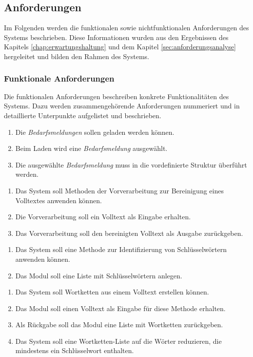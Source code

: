 \subsection{Anforderungen}
Im Folgenden werden die funktionalen sowie nichtfunktionalen Anforderungen des Systems beschrieben. Diese Informationen wurden aus den Ergebnissen des Kapitels \ref{chap:erwartungshaltung} und dem Kapitel \ref{sec:anforderungsanalyse} hergeleitet und bilden den Rahmen des Systems.
\subsubsection{Funktionale Anforderungen}
Die funktionalen Anforderungen beschreiben konkrete Funktionalitäten des Systems. Dazu werden zusammengehörende Anforderungen nummeriert und in detaillierte Unterpunkte aufgelistet und beschrieben.
\begin{enumerate}[label=1.\arabic*]
	\item Die \emph{Bedarfsmeldungen} sollen geladen werden können.
	\item Beim Laden wird eine \emph{Bedarfsmeldung} ausgewählt.
	\item Die ausgewählte \emph{Bedarfsmeldung} muss in die vordefinierte Struktur überführt werden.
\end{enumerate}
\begin{enumerate}[label=2.\arabic*]
	\item Das System soll Methoden der Vorverarbeitung zur Bereinigung eines Volltextes anwenden können.
	\item Die Vorverarbeitung soll ein Volltext als Eingabe erhalten.
	\item Das Vorverarbeitung soll den bereinigten Volltext als Ausgabe zurückgeben.
\end{enumerate}
\begin{enumerate}[label=3.\arabic*]
	\item Das System soll eine Methode zur Identifizierung von Schlüsselwörtern anwenden können.
	\item Das Modul soll eine Liste mit Schlüsselwörtern anlegen.
\end{enumerate}
\begin{enumerate}[label=4.\arabic*]
	\item Das System soll Wortketten aus einem Volltext erstellen können.
	\item Das Modul soll einen Volltext als Eingabe für diese Methode erhalten.
	\item Als Rückgabe soll das Modul eine Liste mit Wortketten zurückgeben.
	\item Das System soll eine Wortketten-Liste auf die Wörter reduzieren, die mindestens ein Schlüsselwort enthalten.
\end{enumerate}

